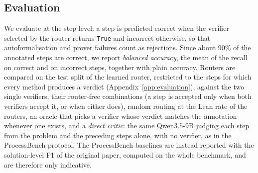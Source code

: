 \subsection{Evaluation}
We evaluate at the step level: a step is predicted correct when the verifier selected by the router returns \texttt{True} and incorrect otherwise, so that autoformalisation and prover failures count as rejections. Since about 90\% of the annotated steps are correct, we report \emph{balanced accuracy}, the mean of the recall on correct and on incorrect steps, together with plain accuracy. Routers are compared on the test split of the learned router, restricted to the steps for which every method produces a verdict (Appendix~\ref{app:evaluation}), against the two single verifiers, their router-free combinations (a step is accepted only when both verifiers accept it, or when either does), random routing at the Lean rate of the routers, an oracle that picks a verifier whose verdict matches the annotation whenever one exists, and a \emph{direct critic}: the same Qwen3.5-9B judging each step from the problem and the preceding steps alone, with no verifier, as in the ProcessBench protocol. The ProcessBench baselines are instead reported with the solution-level F1 of the original paper, computed on the whole benchmark, and are therefore only indicative.
